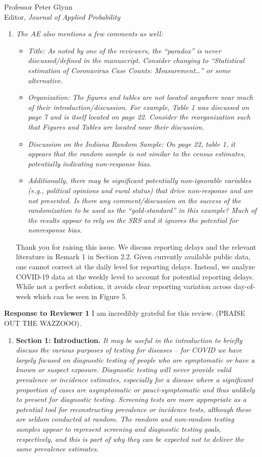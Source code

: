 \documentclass[11pt]{letter} %
\begin{document}
\begin{letter}{Professor
	Peter Glynn\\
	Editor, {\em Journal of Applied Probability}}
\begin{enumerate}
\item {\it The AE also mentions a few comments as well:}
\begin{itemize}
	\item {\it Title: As noted by one of the reviewers, the “paradox” is never discussed/defined in the manuscript. Consider changing to “Statistical estimation of Coronavirus Case Counts: Measurement…” or some alternative.}
	\item {\it Organization: The figures and tables are not located anywhere near much of their introduction/discussion. For example, Table 1 was discussed on page 7 and is itself located on page 22. Consider the reorganization such that Figures and Tables are located near their discussion.}
	\item {\it Discussion on the Indiana Random Sample: On page 22, table 1, it appears that the random sample is not similar to the census estimates, potentially indicating non-response bias.}
	\item {\it Additionally, there may be significant potentially non-ignorable variables (e.g., political opinions and rural status) that drive non-response and are not presented. Is there any comment/discussion on the success of the randomization to be used as the “gold-standard” in this example? Much of the results appear to rely on the SRS and it ignores the potential for nonresponse bias.}
\end{itemize}

\vspace{5mm}
Thank you for raising this issue.  We discuss reporting delays and the relevant literature in Remark 1 in Section 2.2.  Given currently available public data, one cannot correct at the daily level for reporting delays.  Instead, we analyze COVID-19 data at the weekly level to account for potential reporting delays.  While not a perfect solution, it avoids clear reporting variation across day-of-week which can be seen in Figure 5.
\vspace{5mm}
\end{enumerate}
\newpage
{\bf Response to Reviewer 1}
I am incredibly grateful for this review. (PRAISE OUT THE WAZZOOO).

\begin{enumerate}
\item {\bf Section 1: Introduction.} {\it It may be useful in the introduction to briefly discuss the various purposes of testing for diseases – for COVID we have largely focused on diagnostic testing of people who are symptomatic or have a known or suspect exposure. Diagnostic testing will never provide valid prevalence or incidence estimates, especially for a disease where a significant proportion of cases are asymptomatic or pauci-symptomatic and thus unlikely to present for diagnostic testing. Screening tests are more appropriate as a potential tool for reconstructing prevalence or incidence tests, although these are seldom conducted at random. The random and non-random testing samples appear to represent screening and diagnostic testing goals, respectively, and this is part of why they can be expected not to deliver the same prevalence estimates.}


\end{enumerate}
\end{letter}
\end{document}
